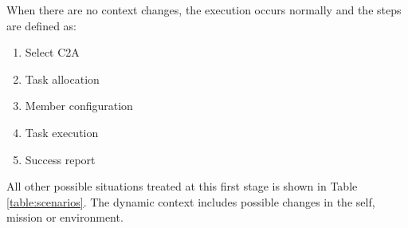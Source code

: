 
When there are no context changes, the execution occurs normally and the steps are defined as:

\begin{enumerate}
    \item Select C2A
    \item Task allocation
    \item Member configuration
    \item Task execution
    \item Success report
\end{enumerate}

All other possible situations treated at this first stage is shown in Table \ref{table:scenarios}. The dynamic context includes possible changes in the self, mission or environment.



